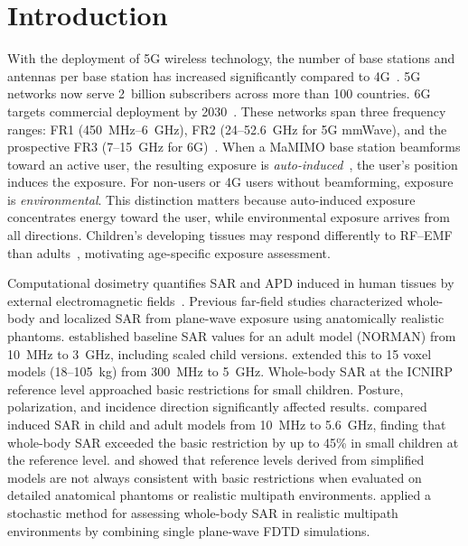 \documentclass{iopjournal}
\begin{document}
\section{Introduction}
\label{sec:introduction}

With the deployment of 5G wireless technology, the number of base stations and antennas per base station has increased significantly compared to 4G~\citep{gsma2024wrc}.
5G networks now serve 2~billion subscribers across more than 100 countries. 6G targets commercial deployment by 2030~\citep{gsma2024wrc}.
These networks span three frequency ranges: FR1 (450~MHz--6~GHz), FR2 (24--52.6~GHz for 5G mmWave), and the prospective FR3 (7--15~GHz for 6G)~\citep{tataria2024cmwave,nextg2023terminology}.
When a \gls{MaMIMO} base station beamforms toward an active user, the resulting exposure is \emph{auto-induced}~\citep{velghe2021protocol}, the user's position induces the exposure.
For non-users or 4G users without beamforming, exposure is \emph{environmental}.
This distinction matters because auto-induced exposure concentrates energy toward the user, while environmental exposure arrives from all directions.
Children's developing tissues may respond differently to \gls{RF}--\gls{EMF} than adults~\citep{peyman2009dielectric}, motivating age-specific exposure assessment.

Computational dosimetry quantifies \gls{SAR} and \gls{APD} induced in human tissues by external electromagnetic fields~\citep{hand2008modeling,hirata2021assessment}.
Previous far-field studies characterized whole-body and localized \gls{SAR} from plane-wave exposure using anatomically realistic phantoms.
\citet{dimbylow2002fdtd} established baseline \gls{SAR} values for an adult model (NORMAN) from 10~MHz to 3~GHz, including scaled child versions.
\citet{uusitupa2010sar} extended this to 15 voxel models (18--105~kg) from 300~MHz to 5~GHz.
Whole-body \gls{SAR} at the \gls{ICNIRP} reference level approached basic restrictions for small children. Posture, polarization, and incidence direction significantly affected results.
\citet{bakker2010children} compared induced \gls{SAR} in child and adult models from 10~MHz to 5.6~GHz, finding that whole-body \gls{SAR} exceeded the basic restriction by up to 45\% in small children at the reference level.
\citet{kuehn2009assessment} and \citet{vermeeren2008electronics} showed that reference levels derived from simplified models are not always consistent with basic restrictions when evaluated on detailed anatomical phantoms or realistic multipath environments.
\citet{vermeeren2008sar} applied a stochastic method for assessing whole-body \gls{SAR} in realistic multipath environments by combining single plane-wave \gls{FDTD} simulations.
\end{document}
